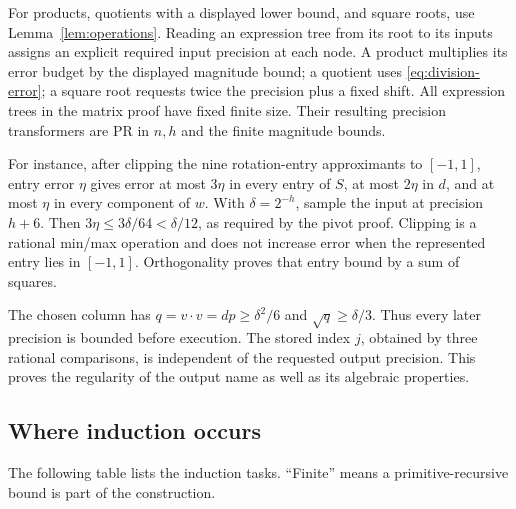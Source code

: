 For products, quotients with a displayed lower bound, and square roots,
use Lemma~\ref{lem:operations}. Reading an expression tree from its root
to its inputs assigns an explicit required input precision at each
node. A product multiplies its error budget by the displayed magnitude
bound; a quotient uses \eqref{eq:division-error}; a square root requests
twice the precision plus a fixed shift. All expression trees in the
matrix proof have fixed finite size. Their resulting precision
transformers are PR in $n,h$ and the finite magnitude bounds.

For instance, after clipping the nine rotation-entry approximants to
$[-1,1]$, entry error $\eta$ gives error at most $3\eta$ in every entry
of $S$, at most $2\eta$ in $d$, and at most $\eta$ in every component
of $w$. With $\delta=2^{-h}$, sample the input at precision $h+6$.
Then $3\eta\le3\delta/64<\delta/12$, as required by the pivot proof.
Clipping is a rational min/max operation and does not increase error
when the represented entry lies in $[-1,1]$. Orthogonality proves that
entry bound by a sum of squares.

The chosen column has $q=v\cdot v=dp\ge\delta^2/6$ and
$\sqrt q\ge\delta/3$. Thus every later precision is bounded before
execution. The stored index $j$, obtained by three rational comparisons,
is independent of the requested output precision. This proves the
regularity of the output name as well as its algebraic properties.

\subsection{Where induction occurs}
The following table lists the induction tasks. ``Finite'' means a
primitive-recursive bound is part of the construction.

